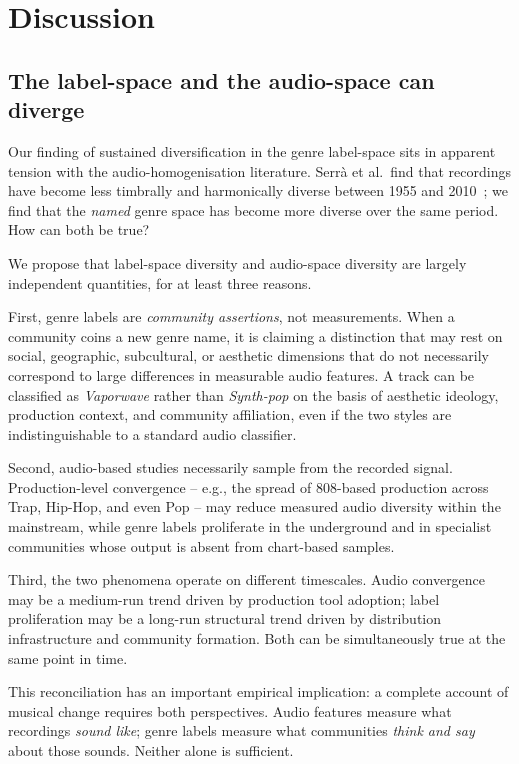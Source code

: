 \documentclass[12pt, a4paper]{article}
\begin{document}
\section{Discussion}
\label{sec:discussion}

\subsection{The label-space and the audio-space can diverge}

Our finding of sustained diversification in the genre label-space
sits in apparent tension with the audio-homogenisation literature.
Serr\`{a} et al.\ find that recordings have become less timbrally
and harmonically diverse between 1955 and 2010~\citep{serra2012measuring};
we find that the \emph{named} genre space has become more diverse
over the same period. How can both be true?

We propose that label-space diversity and audio-space diversity are
largely independent quantities, for at least three reasons.

First, genre labels are \emph{community assertions}, not measurements.
When a community coins a new genre name, it is claiming a distinction
that may rest on social, geographic, subcultural, or aesthetic dimensions
that do not necessarily correspond to large differences in measurable
audio features. A track can be classified as \textit{Vaporwave} rather
than \textit{Synth-pop} on the basis of aesthetic ideology, production
context, and community affiliation, even if the two styles are
indistinguishable to a standard audio classifier.

Second, audio-based studies necessarily sample from the recorded signal.
Production-level convergence -- e.g., the spread of 808-based production
across Trap, Hip-Hop, and even Pop -- may reduce measured audio diversity
within the mainstream, while genre labels proliferate in the underground
and in specialist communities whose output is absent from chart-based
samples.

Third, the two phenomena operate on different timescales.
Audio convergence may be a medium-run trend driven by production tool
adoption; label proliferation may be a long-run structural trend
driven by distribution infrastructure and community formation.
Both can be simultaneously true at the same point in time.

This reconciliation has an important empirical implication: a complete
account of musical change requires both perspectives. Audio features
measure what recordings \emph{sound like}; genre labels measure what
communities \emph{think and say} about those sounds.
Neither alone is sufficient.
\end{document}
